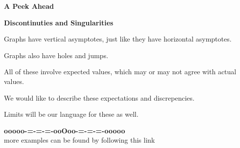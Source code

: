 \documentclass{ximera}
\begin{document}
\textbf{\textcolor{red!70!black}{A Peek Ahead}}


\textbf{Discontinuties and Singularities}


Graphs have vertical asymptotes, just like they have horizontal asymptotes.

Graphs also have holes and jumps.


All of these involve expected values, which may or may not agree with actual values.


We would like to describe these expectations and discrepencies.


Limits will be our language for these as well.













\begin{center}
\textbf{\textcolor{green!50!black}{ooooo-=-=-=-ooOoo-=-=-=-ooooo}} \\

more examples can be found by following this link\\ 

\end{center}
\end{document}
